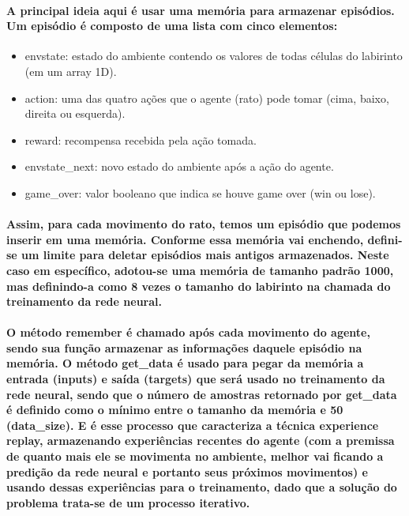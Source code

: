 \documentclass[a4paper]{article}    %
\begin{document}
\paragraph{A principal ideia aqui é usar uma memória para armazenar episódios. Um episódio é composto de uma lista com cinco elementos:}
\begin{itemize}
    \item envstate: estado do ambiente contendo os valores de todas células do labirinto (em um array 1D).
    \item action: uma das quatro ações que o agente (rato) pode tomar (cima, baixo, direita ou esquerda).
    \item reward: recompensa recebida pela ação tomada.
    \item envstate\_next: novo estado do ambiente após a ação do agente.
    \item game\_over: valor booleano que indica se houve game over (win ou lose).
\end{itemize}

\paragraph{Assim, para cada movimento do rato, temos um episódio que podemos inserir em uma memória. Conforme essa memória vai enchendo, defini-se um limite para deletar episódios mais antigos armazenados. Neste caso em específico, adotou-se uma memória de tamanho padrão 1000, mas definindo-a como 8 vezes o tamanho do labirinto na chamada do treinamento da rede neural.}

\paragraph{O método remember é chamado após cada movimento do agente, sendo sua função armazenar as informações daquele episódio na memória. O método get\_data é usado para pegar da memória a entrada (inputs) e saída (targets) que será usado no treinamento da rede neural, sendo que o número de amostras retornado por get\_data é definido como o mínimo entre o tamanho da memória e 50 (data\_size). E é esse processo que caracteriza a técnica experience replay, armazenando experiências recentes do agente (com a premissa de quanto mais ele se movimenta no ambiente, melhor vai ficando a predição da rede neural e portanto seus próximos movimentos) e usando dessas experiências para o treinamento, dado que a solução do problema trata-se de um processo iterativo.}
\end{document}
